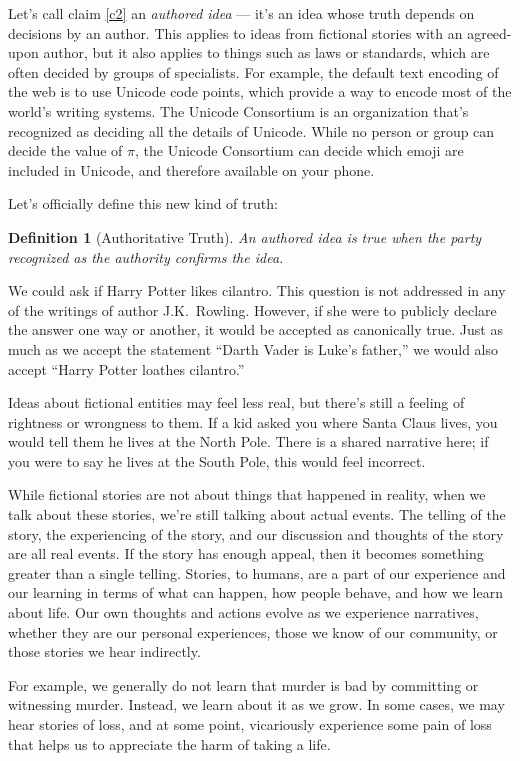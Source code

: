 \documentclass[11pt, oneside]{article}   	%
\newtheorem{defn}{Definition}
\begin{document}
Let's call claim \ref{c2} an {\em authored idea} --- it's an idea whose
truth depends on decisions by an author.
This applies to ideas from fictional stories with an agreed-upon
author, but it also applies to things such as laws or standards, which are often
decided by groups of specialists. For example, the default text encoding of the
web is to use Unicode code points, which provide a way to encode most of the
world's writing systems. The Unicode Consortium is an organization that's
recognized as deciding all the details of Unicode.
While no person or group can decide the value of $\pi$, the Unicode Consortium
can decide which emoji are included in Unicode, and therefore available on your
phone.

Let's officially define this new kind of truth:
\begin{defn}[Authoritative Truth]
    An authored idea is true when the party recognized as the authority confirms
    the idea.
\end{defn}

We could ask if Harry Potter likes cilantro. This question is not addressed in
any of the writings of author J.K.~Rowling. However, if she were to publicly
declare the answer one way or another, it would be accepted as canonically true.
Just as much as we accept the statement ``Darth Vader is Luke's father,'' we
would also accept ``Harry Potter loathes cilantro.''

Ideas about fictional entities may feel less real,
but there's still a feeling of rightness or wrongness to them.
If a kid asked you where Santa Claus lives, you would tell them he
lives at the North Pole. There is a shared narrative here; if you were to say he
lives at the South Pole, this would feel incorrect.

While fictional stories are not about things that happened in reality, when we
talk about these stories, we're still talking about actual events. The telling
of the story,
the experiencing of the story, and our discussion and thoughts of the
story are all real events.
If the story has enough appeal,
then it becomes something greater than a single telling.
Stories,
to humans, are a part of our experience and our learning in terms of what can
happen, how people behave, and how we learn about life. Our own thoughts and
actions evolve as we experience narratives, whether they are our personal
experiences, those we know of our community, or those stories we hear
indirectly.

For example, we generally do not learn that murder is bad by committing or
witnessing murder. Instead, we learn about it as we grow. In some cases, we may
hear stories of loss, and at some point, vicariously experience some pain of
loss that helps us to appreciate the harm of taking a life.
\end{document}
